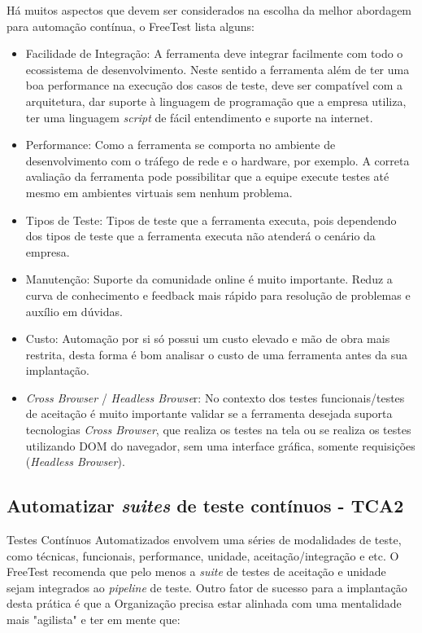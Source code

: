 Há muitos aspectos que devem ser considerados na escolha da melhor abordagem para automação contínua, o FreeTest lista alguns:

\begin{itemize}
	\item Facilidade de Integração: A ferramenta deve integrar facilmente com todo o ecossistema de desenvolvimento. Neste sentido a ferramenta além de ter uma boa performance na execução dos casos de teste, deve ser compatível com a arquitetura, dar suporte à linguagem de programação que a empresa utiliza, ter uma linguagem \textit{script} de fácil entendimento e suporte na internet.
	\item Performance: Como a ferramenta se comporta no ambiente de desenvolvimento com o tráfego de rede e o hardware, por exemplo. A correta avaliação da ferramenta pode possibilitar que a equipe execute testes até mesmo em ambientes virtuais sem nenhum problema.
	\item Tipos de Teste: Tipos de teste que a ferramenta executa, pois dependendo dos tipos de teste que a ferramenta executa não atenderá o cenário da empresa.
	\item Manutenção: Suporte da comunidade online é muito importante. Reduz a curva de conhecimento e feedback mais rápido para resolução de problemas e auxílio em dúvidas.
	\item Custo: Automação por si só possui um custo elevado e mão de obra mais restrita, desta forma é bom analisar o custo de uma ferramenta antes da sua implantação.
	\item \textit{Cross Browser} / \textit{Headless Browse}r: No contexto dos testes funcionais/testes de aceitação é muito importante validar se a ferramenta desejada suporta tecnologias \textit{Cross Browser}, que realiza os testes na tela ou se realiza os testes utilizando DOM do navegador, sem uma interface gráfica, somente requisições (\textit{Headless Browser}).
\end{itemize}


\subsection{Automatizar \textit{suites} de teste contínuos - TCA2}

Testes Contínuos Automatizados envolvem uma séries de modalidades de teste, como técnicas, funcionais, performance, unidade, aceitação/integração e etc. O FreeTest recomenda que pelo menos a \textit{suite} de testes de aceitação e unidade sejam integrados ao \textit{pipeline} de teste. Outro fator de sucesso para a implantação desta prática é que a Organização precisa estar alinhada com uma mentalidade mais "agilista" e ter em mente que:


